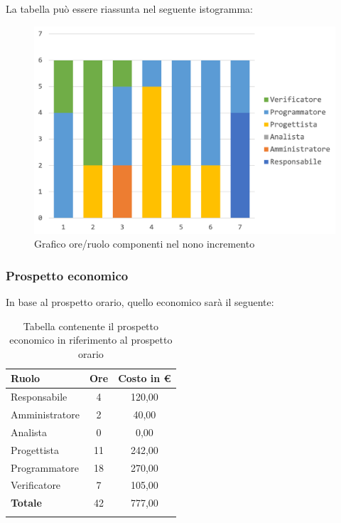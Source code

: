 		La tabella può essere riassunta nel seguente istogramma:
		\begin{figure}[H]
			\centering
			\includegraphics[width=0.8\linewidth]{./images/preventivo/incremento9-1.png}
			\caption{Grafico ore/ruolo componenti nel nono incremento}
			\label{fig:grafico suddivione ruoli incremento IX}
		\end{figure}
		
		\subsubsection{Prospetto economico}
		In base al prospetto orario, quello economico sarà il seguente: 
		
		\begin{longtable}{|l|c|c|}
			\hline
			\rowcolor{lighter-grayer}
			\textbf{Ruolo} & \textbf{Ore} & \textbf{Costo in € } \\
			\hline
			\endfirsthead
			
			\hline
			Responsabile 	    & 4 & 120,00\\
			\hline 
			\hline
			Amministratore	   & 2 & 40,00\\
			\hline
			\hline
			Analista 				& 0 & 0,00\\
			\hline
			\hline
			Progettista 		   & 11 & 242,00\\
			\hline
			\hline
			Programmatore 	  & 18 & 270,00\\
			\hline
			\hline
			Verificatore 		   & 7 & 105,00\\
			\hline
			\textbf{Totale} 	 & 42 & 777,00\\
			\hline
			\caption{Tabella contenente il prospetto economico in riferimento al prospetto orario}
		\end{longtable}
		\pagebreak
		
